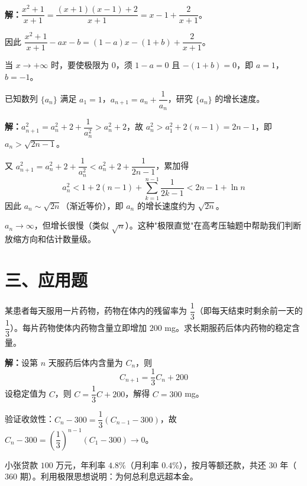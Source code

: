 \documentclass[12pt, a4paper]{ctexart}
\begin{document}
\textbf{解：}$\dfrac{x^2 + 1}{x + 1} = \dfrac{(x+1)(x-1) + 2}{x + 1} = x - 1 + \dfrac{2}{x + 1}$。

因此 $\dfrac{x^2 + 1}{x + 1} - ax - b = (1-a)x - (1+b) + \dfrac{2}{x+1}$。

当 $x \to +\infty$ 时，要使极限为 $0$，须 $1 - a = 0$ 且 $-(1+b) = 0$，即 $a = 1$，$b = -1$。

\begin{examplebox}[【例题10】极限视角看高考压轴数列]
已知数列 $\{a_n\}$ 满足 $a_1 = 1$，$a_{n+1} = a_n + \dfrac{1}{a_n}$，研究 $\{a_n\}$ 的增长速度。
\end{examplebox}

\textbf{解：}$a_{n+1}^2 = a_n^2 + 2 + \dfrac{1}{a_n^2} > a_n^2 + 2$，故 $a_n^2 > a_1^2 + 2(n-1) = 2n - 1$，即 $a_n > \sqrt{2n-1}$。

又 $a_{n+1}^2 = a_n^2 + 2 + \dfrac{1}{a_n^2} < a_n^2 + 2 + \dfrac{1}{2n-1}$，累加得
\[
a_n^2 < 1 + 2(n-1) + \sum_{k=1}^{n-1} \frac{1}{2k-1} < 2n - 1 + \ln n
\]
因此 $a_n \sim \sqrt{2n}$（渐近等价），即 $a_n$ 的增长速度约为 $\sqrt{2n}$。

\begin{tipbox}[极限直觉]
$a_n \to \infty$，但增长很慢（类似 $\sqrt{n}$）。这种"极限直觉"在高考压轴题中帮助我们判断放缩方向和估计数量级。
\end{tipbox}

\section*{\textcolor{apppurple}{三、应用题}}

\begin{appbox}[【应用1】药物浓度问题]
某患者每天服用一片药物，药物在体内的残留率为 $\dfrac{1}{3}$（即每天结束时剩余前一天的 $\dfrac{1}{3}$）。每片药物使体内药物含量立即增加 $200$ mg。求长期服药后体内药物的稳定含量。
\end{appbox}

\textbf{解：}设第 $n$ 天服药后体内含量为 $C_n$，则
\[
C_{n+1} = \frac{1}{3} C_n + 200
\]
设稳定值为 $C$，则 $C = \dfrac{1}{3}C + 200$，解得 $C = 300$ mg。

验证收敛性：$C_n - 300 = \dfrac{1}{3}(C_{n-1} - 300)$，故 $C_n - 300 = \left(\dfrac{1}{3}\right)^{n-1}(C_1 - 300) \to 0$。

\begin{appbox}[【应用2】房贷还款模型]
小张贷款 $100$ 万元，年利率 $4.8\%$（月利率 $0.4\%$），按月等额还款，共还 $30$ 年（$360$ 期）。利用极限思想说明：为何总利息远超本金。
\end{appbox}
\end{document}
